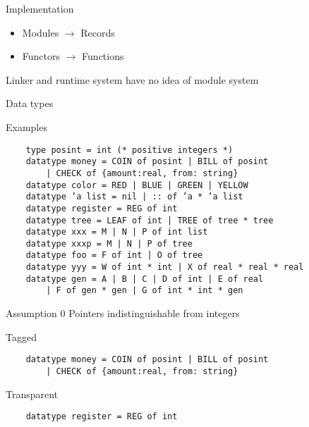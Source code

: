 \documentclass[presentation]{beamer}
\begin{document}
\begin{frame}{Implementation}
  \pause
  \begin{block}{}
    \begin{itemize}
    \item{Modules $\rightarrow$ Records}
    \item{Functors $\rightarrow$ Functions}
    \end{itemize}
    Linker and runtime system have no idea of module system
  \end{block} 
\end{frame}

\begin{frame}[fragile]{Data types}
  \begin{block}{Examples}
\begin{verbatim}
    type posint = int (* positive integers *)
    datatype money = COIN of posint | BILL of posint
        | CHECK of {amount:real, from: string}
    datatype color = RED | BLUE | GREEN | YELLOW
    datatype ’a list = nil | :: of ’a * ’a list
    datatype register = REG of int
    datatype tree = LEAF of int | TREE of tree * tree
    datatype xxx = M | N | P of int list
    datatype xxxp = M | N | P of tree
    datatype foo = F of int | O of tree
    datatype yyy = W of int * int | X of real * real * real
    datatype gen = A | B | C | D of int | E of real
        | F of gen * gen | G of int * int * gen
\end{verbatim}
  \end{block}
\end{frame}

\begin{frame}[fragile]{Assumption 0}
 Pointers indistinguishable from integers
  \begin{block}{Tagged}
\begin{verbatim}
    datatype money = COIN of posint | BILL of posint
        | CHECK of {amount:real, from: string}
\end{verbatim}
  \end{block}
  \pause
  \begin{block}{Transparent}
\begin{verbatim}
    datatype register = REG of int
\end{verbatim}
  \end{block}
\end{frame}
\end{document}
